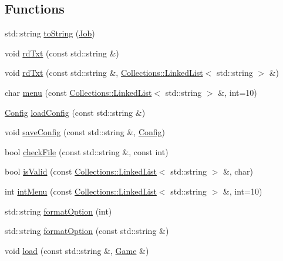 \subsection*{Functions}
\begin{DoxyCompactItemize}
\item 
std\+::string \hyperlink{namespace_flow_a6f3143a530f180f3bff735701d83f295}{to\+String} (\hyperlink{namespace_flow_a05bb774db920847e46f3779aaef1b07b}{Job})
\item 
void \hyperlink{namespace_flow_a652e3e72e118566969bd80c132bd4964}{rd\+Txt} (const std\+::string \&)
\item 
void \hyperlink{namespace_flow_ab782d7fd4c61d0f51cb745bc19ba4158}{rd\+Txt} (const std\+::string \&, \hyperlink{class_collections_1_1_linked_list}{Collections\+::\+Linked\+List}$<$ std\+::string $>$ \&)
\item 
char \hyperlink{namespace_flow_a77375f0311e9ec10f181058d624dba17}{menu} (const \hyperlink{class_collections_1_1_linked_list}{Collections\+::\+Linked\+List}$<$ std\+::string $>$ \&, int=10)
\item 
\hyperlink{struct_flow_1_1_config}{Config} \hyperlink{namespace_flow_a6f9081155759b0d9a6545badc4603044}{load\+Config} (const std\+::string \&)
\item 
void \hyperlink{namespace_flow_a1472c76eeade42bed525c93af67ace3c}{save\+Config} (const std\+::string \&, \hyperlink{struct_flow_1_1_config}{Config})
\item 
bool \hyperlink{namespace_flow_af73c384d39ee61b154837a386204cbb3}{check\+File} (const std\+::string \&, const int)
\item 
bool \hyperlink{namespace_flow_a479c1b994bc40845aabea05a48e229ba}{is\+Valid} (const \hyperlink{class_collections_1_1_linked_list}{Collections\+::\+Linked\+List}$<$ std\+::string $>$ \&, char)
\item 
int \hyperlink{namespace_flow_af997fd944ca97b653f33cc9889a5e1a2}{int\+Menu} (const \hyperlink{class_collections_1_1_linked_list}{Collections\+::\+Linked\+List}$<$ std\+::string $>$ \&, int=10)
\item 
std\+::string \hyperlink{namespace_flow_a4d43a09e0707e54c7c176637077113af}{format\+Option} (int)
\item 
std\+::string \hyperlink{namespace_flow_ab6fa41130934e9e1394a8954927dc599}{format\+Option} (const std\+::string \&)
\item 
void \hyperlink{namespace_flow_ae8f5010f6747afed79b8305689e12fe8}{load} (const std\+::string \&, \hyperlink{class_flow_1_1_game}{Game} \&)

\end{DoxyCompactItemize}
